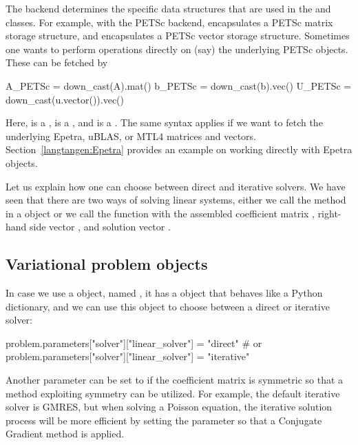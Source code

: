 The backend determines the specific data structures that are used in
the  and  classes. For example, with the PETSc
backend,  encapsulates a PETSc matrix storage structure, and
 encapsulates a PETSc vector storage structure.  Sometimes
one wants to perform operations directly on (say) the underlying PETSc
objects. These can be fetched by 
\begin{python}
A_PETSc = down_cast(A).mat()
b_PETSc = down_cast(b).vec()
U_PETSc = down_cast(u.vector()).vec()
\end{python}
Here,  is a ,  is a , and
 is a .  The same syntax applies if we want to
fetch the underlying Epetra, uBLAS, or MTL4 matrices and vectors.
Section~\ref{langtangen:Epetra} provides an example on working directly
with Epetra objects.

Let us explain how one can choose between direct and iterative solvers.
We have seen that there are two ways of solving linear systems,
either we call the  method in a 
object or we call the  function with the assembled
coefficient matrix , right-hand side vector , and solution
vector .

\subsection{Variational problem objects}

In case we use a  object, named ,
it has a  object that behaves like a Python dictionary,
and we can use this object to choose between a direct or iterative solver:
\begin{python}
problem.parameters["solver"]["linear_solver"] = "direct"
# or
problem.parameters["solver"]["linear_solver"] = "iterative"
\end{python}
Another parameter  can be set to  if the
coefficient matrix is symmetric so that a method exploiting symmetry
can be utilized.  For example, the default iterative solver is GMRES,
but when solving a Poisson equation, the iterative solution process will
be more efficient by setting the  parameter so that a
Conjugate Gradient method is applied.

